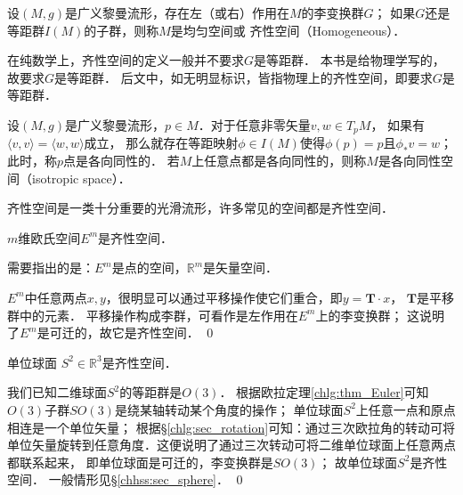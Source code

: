 \begin{definition}\label{chhss:def_Homogeneous}
    设$(M,g)$是广义黎曼流形，存在左（或右）作用在$M$的李变换群$G$；
    如果$G$还是等距群$I(M)$的子群，则称$M$是{\heiti 均匀空间}或
    {\heiti 齐性空间}（Homogeneous）．
\end{definition}

在纯数学上，齐性空间的定义一般并不要求$G$是等距群．
本书是给物理学写的，故要求$G$是等距群．
后文中，如无明显标识，皆指物理上的齐性空间，即要求$G$是等距群．


\begin{definition}\label{chhss:def_isotropic-space}
    设$(M,g)$是广义黎曼流形，$p\in M$．对于任意非零矢量$v,w \in T_p M$，
    如果有$\langle v, v \rangle = \langle w, w \rangle$成立，
    那么就存在等距映射$\phi\in I(M)$使得$\phi(p)=p$且$\phi_* v = w$；
    此时，称$p$点是{\heiti 各向同性的}．
    若$M$上任意点都是各向同性的，则称$M$是{\heiti 各向同性空间}（isotropic space）．
\end{definition}




齐性空间是一类十分重要的光滑流形，许多常见的空间都是齐性空间．


\begin{example}
    $m$维欧氏空间$E^m$是齐性空间．
\end{example}

需要指出的是：$E^m$是{\kaishu 点}的空间，$\mathbb{R}^m$是{\kaishu 矢量}空间．

$E^m$中任意两点$x,y$，很明显可以通过平移操作使它们重合，即$y=\boldsymbol{T}\cdot x$，
$\boldsymbol{T}$是平移群中的元素．
平移操作构成李群，可看作是左作用在$E^m$上的李变换群；
这说明了$E^m$是可迁的，故它是齐性空间．
\qed

\begin{example}
    单位球面 $S^2 \in \mathbb{R}^{3}$是齐性空间．
\end{example}
我们已知二维球面$S^2$的等距群是$O(3)$．
根据欧拉定理\ref{chlg:thm_Euler}可知$O(3)$子群$SO(3)$是绕某轴转动某个角度的操作；
单位球面$S^2$上任意一点和原点相连是一个单位矢量；
根据\S\ref{chlg:sec_rotation}可知：通过三次欧拉角的转动可将
单位矢量旋转到任意角度．这便说明了通过三次转动可将二维单位球面上任意两点都联系起来，
即单位球面是可迁的，李变换群是$SO(3)$；
故单位球面$S^2$是齐性空间．  
一般情形见\S\ref{chhss:sec_sphere}． \qed





